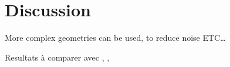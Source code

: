 \section{Discussion}
More complex geometries can be used, to reduce noise ETC\ldots \cite{burke_introduction_2013}

Resultats à comparer avec \cite{ou_dark_2024}, \cite{jia_research_2022}, \cite{mroz_rotation_2019}